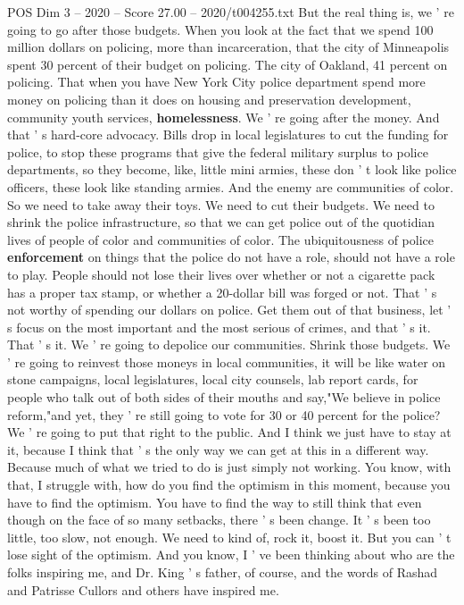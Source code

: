 \begin{textsample}{POS Dim 3 – 2020 – Score 27.00 – 2020/t004255.txt}
But the real thing is, we ' re going to go after those budgets.
When you look at the fact that we spend 100 million dollars on policing, more than incarceration, that the city of Minneapolis spent 30 percent of their budget on policing.
The city of Oakland, 41 percent on policing.
That when you have New York City police department spend more money on policing than it does on housing and preservation development, community youth services, \textbf{homelessness}.
We ' re going after the money.
And that ' s hard-core advocacy.
Bills drop in local legislatures to cut the funding for police, to stop these programs that give the federal military surplus to police departments, so they become, like, little mini armies, these don ' t look like police officers, these look like standing armies.
And the enemy are communities of color.
So we need to take away their toys.
We need to cut their budgets.
We need to shrink the police infrastructure, so that we can get police out of the quotidian lives of people of color and communities of color.
The ubiquitousness of police \textbf{enforcement} on things that the police do not have a role, should not have a role to play.
People should not lose their lives over whether or not a cigarette pack has a proper tax stamp, or whether a 20-dollar bill was forged or not.
That ' s not worthy of spending our dollars on police.
Get them out of that business, let ' s focus on the most important and the most serious of crimes, and that ' s it.
That ' s it.
We ' re going to depolice our communities.
Shrink those budgets.
We ' re going to reinvest those moneys in local communities, it will be like water on stone campaigns, local legislatures, local city counsels, lab report cards, for people who talk out of both sides of their mouths and say,"We believe in police reform,"and yet, they ' re still going to vote for 30 or 40 percent for the police?
We ' re going to put that right to the public.
And I think we just have to stay at it, because I think that ' s the only way we can get at this in a different way.
Because much of what we tried to do is just simply not working.
You know, with that, I struggle with, how do you find the optimism in this moment, because you have to find the optimism.
You have to find the way to still think that even though on the face of so many setbacks, there ' s been change.
It ' s been too little, too slow, not enough.
We need to kind of, rock it, boost it.
But you can ' t lose sight of the optimism.
And you know, I ' ve been thinking about who are the folks inspiring me, and Dr.
King ' s father, of course, and the words of Rashad and Patrisse Cullors and others have inspired me.

\end{textsample}
